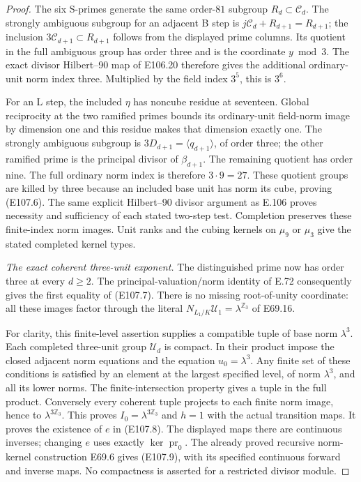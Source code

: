 \begin{proof}
The six S-primes generate the same order-\(81\) subgroup
\(R_d\subset\mathcal C_d\). The strongly ambiguous subgroup
for an adjacent B step is \(j\mathcal C_d+R_{d+1}=R_{d+1}\);
the inclusion \(3\mathcal C_{d+1}\subset R_{d+1}\) follows
from the displayed prime columns. Its quotient in the full
ambiguous group has order three and is the coordinate \(y\bmod3\).
The exact divisor Hilbert--90 map of E106.20 therefore gives the
additional ordinary-unit norm index three. Multiplied by the
field index \(3^5\), this is \(3^6\).

For an L step, the included \(\eta\) has noncube residue at seventeen.
Global reciprocity at the two ramified primes bounds its
ordinary-unit field-norm image by dimension one and this residue
makes that dimension exactly one. The strongly ambiguous subgroup
is \(3D_{d+1}=\langle q_{d+1}\rangle\), of order three;
the other ramified prime is the principal divisor of \(\beta_{d+1}\).
The remaining quotient has order nine. The full ordinary
norm index is therefore \(3\cdot9=27\). These quotient groups
are killed by three because an included base unit has norm its
cube, proving (E107.6).
The same explicit Hilbert--90 divisor argument as E.106 proves
necessity and sufficiency of each stated two-step test.
Completion preserves these finite-index norm images.
Unit ranks and the cubing kernels on \(\mu_9\) or \(\mu_3\)
give the stated completed kernel types.

\emph{The exact coherent three-unit exponent.}
The distinguished prime now has order three at every \(d\ge2\).
The principal-valuation/norm identity of E.72 consequently gives
the first equality of (E107.7). There is no missing root-of-unity
coordinate: all these images factor through the literal
\(N_{L_1/K}\mathcal U_1=\lambda^{\mathbb Z_3}\) of E69.16.

For clarity, this finite-level assertion supplies a compatible
tuple of base norm \(\lambda^3\). Each completed three-unit group
\(\mathcal U_d\) is compact. In their product impose the closed
adjacent norm equations and the equation \(u_0=\lambda^3\).
Any finite set of these conditions is satisfied by an element
at the largest specified level, of norm \(\lambda^3\), and all
its lower norms. The finite-intersection property gives a tuple
in the full product. Conversely every coherent tuple projects
to each finite norm image, hence to \(\lambda^{3\mathbb Z_3}\).
This proves \(I_0=\lambda^{3\mathbb Z_3}\) and \(h=1\) with
the actual transition maps.
It proves the existence of \(e\) in (E107.8).
The displayed maps there are continuous inverses; changing \(e\)
uses exactly \(\ker\operatorname{pr}_0\).
The already proved recursive norm-kernel construction E69.6
gives (E107.9), with its specified continuous forward and inverse
maps. No compactness is asserted for a restricted divisor module.


\end{proof}
